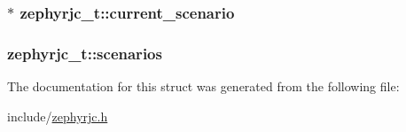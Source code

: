 \subsubsection[{\texorpdfstring{current\+\_\+scenario}{current\_scenario}}]{$\ast$ zephyrjc\+\_\+t\+::current\+\_\+scenario}\hypertarget{structzephyrjc__t_a72c00754a438f734de92e2dfc26af6fd}{}\label{structzephyrjc__t_a72c00754a438f734de92e2dfc26af6fd}
\subsubsection[{\texorpdfstring{scenarios}{scenarios}}]{ zephyrjc\+\_\+t\+::scenarios}\hypertarget{structzephyrjc__t_a1a1b1b67ffc0bb743303ebebe105e7ad}{}\label{structzephyrjc__t_a1a1b1b67ffc0bb743303ebebe105e7ad}


The documentation for this struct was generated from the following file\+:\begin{DoxyCompactItemize}
\item 
include/\hyperlink{zephyrjc_8h}{zephyrjc.\+h}\end{DoxyCompactItemize}
